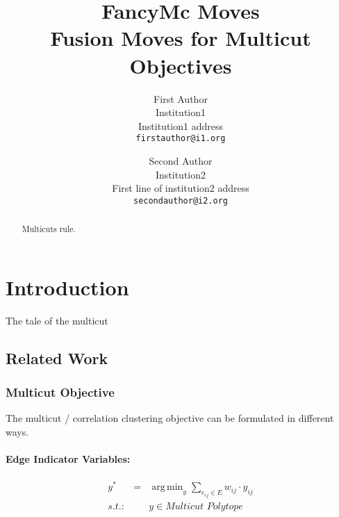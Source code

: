 \documentclass[10pt,twocolumn,letterpaper]{article}
\DeclareMathOperator*{\argmin}{arg\,min}
\begin{document}

\title{FancyMc Moves \\ Fusion Moves for Multicut Objectives}

\author{First Author\\
Institution1\\
Institution1 address\\
{\tt\small firstauthor@i1.org}
\and
Second Author\\
Institution2\\
First line of institution2 address\\
{\tt\small secondauthor@i2.org}
}

\maketitle

\begin{abstract}
   Multicuts rule.
\end{abstract}
\section{Introduction}

The tale of the multicut


\subsection{Related Work}


\subsubsection{Multicut Objective}

The multicut / correlation clustering objective 
can be formulated in different ways.



\paragraph{Edge Indicator Variables:}
\begin{center}
    \begin{eqnarray}
        y^* &=& \argmin_{y} \sum_{ e_{ij} \in E } w_{ij} \cdot y_{ij} \\
        s.t.:& & y \in \textit{Multicut Polytope} \nonumber
    \end{eqnarray}
\end{center}
\end{document}
